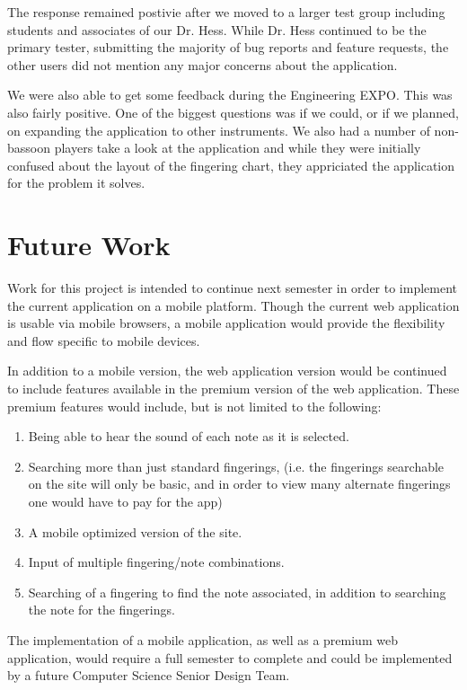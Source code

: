 \documentclass[12pt,english]{article}
\begin{document}
The response remained postivie after we moved to a larger test group
including students and associates of our Dr. Hess.  While Dr. Hess continued
to be the primary tester, submitting the majority of bug reports and feature
requests, the other users did not mention any major concerns about the application.

We were also able to get some feedback during the Engineering EXPO.  This
was also fairly positive.  One of the biggest questions was if we could, or
if we planned, on expanding the application to other instruments.  We also
had a number of non-bassoon players take a look at the application and while
they were initially confused about the layout of the fingering chart, they
appriciated the application for the problem it solves.

\section{Future Work}

Work for this project is intended to continue next semester in order
to implement the current application on a mobile platform. Though
the current web application is usable via mobile browsers, a mobile
application would provide the flexibility and flow specific to mobile
devices.

In addition to a mobile version, the web application version would
be continued to include features available in the premium version
of the web application. These premium features would include, but
is not limited to the following: 
\begin{enumerate}
\item Being able to hear the sound of each note as it is selected. 
\item Searching more than just standard fingerings, (i.e. the fingerings
searchable on the site will only be basic, and in order to view many
alternate fingerings one would have to pay for the app) 
\item A mobile optimized version of the site. 
\item Input of multiple fingering/note combinations. 
\item Searching of a fingering to find the note associated, in addition
to searching the note for the fingerings. 
\end{enumerate}
The implementation of a mobile application, as well as a premium web
application, would require a full semester to complete and could be
implemented by a future Computer Science Senior Design Team.
\end{document}
